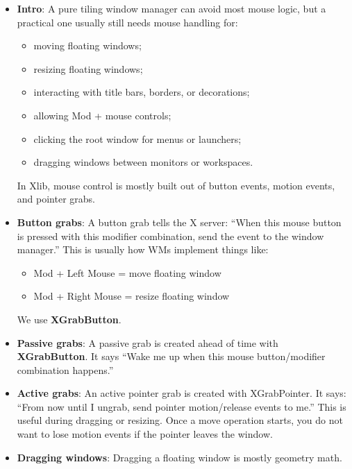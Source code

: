 \documentclass{report}
\begin{document}
    \pagebreak 
    \begin{itemize}
        \item \textbf{Intro}: A pure tiling window manager can avoid most mouse logic, but a practical one usually still needs mouse handling for:
            \begin{itemize}
                \item moving floating windows;
                \item resizing floating windows;
                \item interacting with title bars, borders, or decorations;
                \item allowing Mod + mouse controls;
                \item clicking the root window for menus or launchers;
                \item dragging windows between monitors or workspaces.
            \end{itemize}
            In Xlib, mouse control is mostly built out of button events, motion events, and pointer grabs.
        \item \textbf{Button grabs}: A button grab tells the X server: “When this mouse button is pressed with this modifier combination, send the event to the window manager.”
            \bigbreak \noindent 
            This is usually how WMs implement things like:
            \begin{itemize}
                \item Mod + Left Mouse  = move floating window
                \item Mod + Right Mouse = resize floating window
            \end{itemize}
            \bigbreak \noindent 
            We use \textbf{XGrabButton}.
        \item \textbf{Passive grabs}: A passive grab is created ahead of time with \textbf{XGrabButton}. It says “Wake me up when this mouse button/modifier combination happens.” 
        \item \textbf{Active grabs}: An active pointer grab is created with XGrabPointer.
            \bigbreak \noindent 
            It says: “From now until I ungrab, send pointer motion/release events to me.”
            \bigbreak \noindent 
            This is useful during dragging or resizing. Once a move operation starts, you do not want to lose motion events if the pointer leaves the window.
        \item \textbf{Dragging windows}: Dragging a floating window is mostly geometry math.

\end{itemize}
\end{document}
